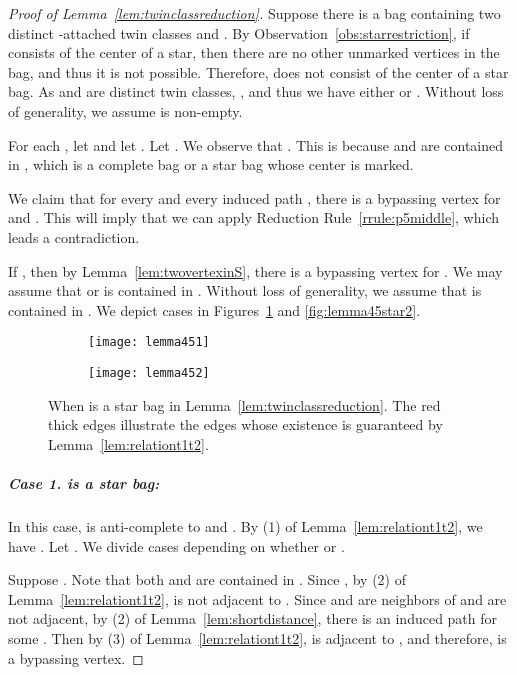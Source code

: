 \documentclass[11pt]{elsarticle}
\begin{document}
 \begin{proof}[Proof of Lemma~\ref{lem:twinclassreduction}]
Suppose there is a bag containing two distinct -attached twin classes  and .
By Observation~\ref{obs:starrestriction}, if  consists of the center of a star, then there are no other unmarked vertices in the bag, and thus it is not possible.
Therefore,  does not consist of the center of a star bag.
As  and  are distinct twin classes, , and thus we have 
either  or .
Without loss of generality, we assume  is non-empty.


For each , let  and let . Let .
We observe that .
This is because  and  are contained in , which is a complete bag or a star bag whose center is marked.

We claim that for every  and every induced path ,
there is a bypassing vertex for  and . 
This will imply that we can apply Reduction Rule~\ref{rrule:p5middle}, which leads a contradiction.

If , then by Lemma~\ref{lem:twovertexinS}, there is a bypassing vertex for .
We may assume that  or  is contained in .
Without loss of generality, we assume that  is contained in .
We depict cases in Figures~\ref{fig:lemma45star1} and \ref{fig:lemma45star2}.



  \begin{figure}[t]
\begin{subfigure}[b]{0.5\textwidth}
      \texttt{[image: lemma451]}
      \caption{}
      \end{subfigure}
      \qquad
\begin{subfigure}[b]{0.5\textwidth}
      \texttt{[image: lemma452]}
      \caption{}
      \end{subfigure}
            \caption{When  is a star bag in Lemma~\ref{lem:twinclassreduction}.
The red thick edges illustrate the edges whose existence is guaranteed by Lemma~\ref{lem:relationt1t2}. } \label{fig:lemma45star1}
  \end{figure}


\subparagraph{\textbf{Case 1.}  is a star bag:}  
In this case,  is anti-complete to  and .
By (1) of Lemma~\ref{lem:relationt1t2}, we have . Let . 
We divide cases depending on whether  or .

Suppose . Note that both  and  are contained in .
Since , by (2) of Lemma~\ref{lem:relationt1t2},
 is not adjacent to .
Since  and  are neighbors of  and  are not adjacent, by (2) of Lemma~\ref{lem:shortdistance}, there is an induced path  for some .
Then by (3) of Lemma~\ref{lem:relationt1t2},  is adjacent to , and therefore,  is a bypassing vertex.


\end{proof}
\end{document}
